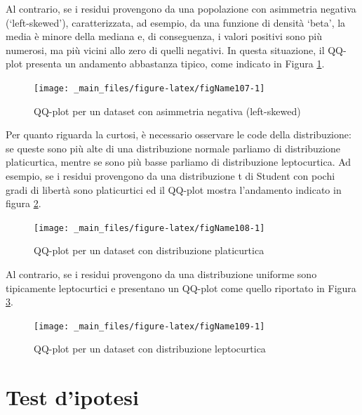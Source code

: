 \documentclass[a4paper,12pt,oneside]{book}
\begin{document}
Al contrario, se i residui provengono da una popolazione con asimmetria negativa (`left-skewed'), caratterizzata, ad esempio, da una funzione di densità `beta', la media è minore della mediana e, di conseguenza, i valori positivi sono più numerosi, ma più vicini allo zero di quelli negativi. In questa situazione, il QQ-plot presenta un andamento abbastanza tipico, come indicato in Figura \ref{fig:figName107}.

\begin{figure}

{\centering \texttt{[image: \_main\_files/figure-latex/figName107-1]} 

}

\caption{QQ-plot per un dataset con asimmetria negativa (left-skewed)}\label{fig:figName107}
\end{figure}

Per quanto riguarda la curtosi, è necessario osservare le code della distribuzione: se queste sono più alte di una distribuzione normale parliamo di distribuzione platicurtica, mentre se sono più basse parliamo di distribuzione leptocurtica. Ad esempio, se i residui provengono da una distribuzione t di Student con pochi gradi di libertà sono platicurtici ed il QQ-plot mostra l'andamento indicato in figura \ref{fig:figName108}.

\begin{figure}

{\centering \texttt{[image: \_main\_files/figure-latex/figName108-1]} 

}

\caption{QQ-plot per un dataset con distribuzione platicurtica}\label{fig:figName108}
\end{figure}

Al contrario, se i residui provengono da una distribuzione uniforme sono tipicamente leptocurtici e presentano un QQ-plot come quello riportato in Figura \ref{fig:figName109}.

\begin{figure}

{\centering \texttt{[image: \_main\_files/figure-latex/figName109-1]} 

}

\caption{QQ-plot per un dataset con distribuzione leptocurtica}\label{fig:figName109}
\end{figure}

\hypertarget{test-dipotesi-1}{%
\section{Test d'ipotesi}\label{test-dipotesi-1}}
\end{document}
